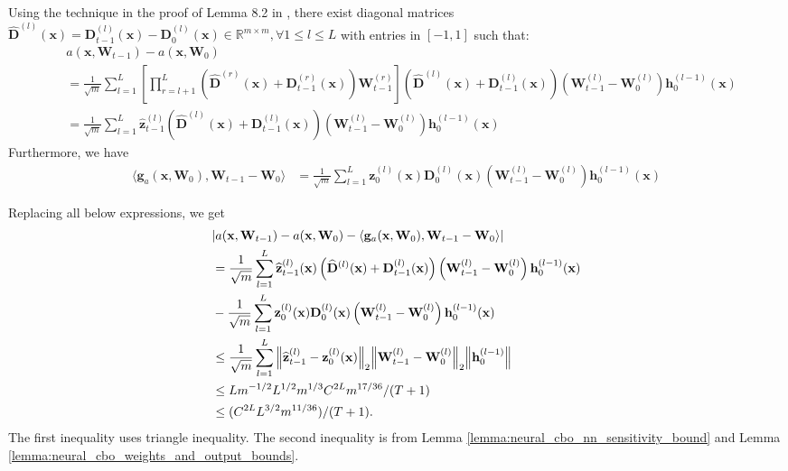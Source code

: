 Using the technique in the proof of Lemma 8.2 in \citep{allen2019convergence},  there exist diagonal matrices $\widehat{\mathbf{D}}^{(l)} (\mathbf{x}) = \mathbf{D}_{t-1}^{(l)}(\mathbf{x}) - \mathbf{D}_{0}^{(l)}(\mathbf{x})   \in \mathbb{R}^{m \times m}, \forall 1\le l \le L$ with entries in
$[-1,1]$ such that:
\begin{align*}
    &  a(\mathbf{x}, \mathbf{W}_{t-1}) - a(\mathbf{x}, \mathbf{W}_{0}) 
    \\
    & = \frac{1}{\sqrt{m}} \sum_{l=1}^L \left [ \prod_{r = l+1}^L \left(\widehat{\mathbf{D}}^{(r)} (\mathbf{x}) + \mathbf{D}_{t-1}^{(r)} (\mathbf{x}) \right) \mathbf{W}_{t-1}^{(r)} \right] \left (\widehat{\mathbf{D}}^{(l)} (\mathbf{x}) + \mathbf{D}_{t-1}^{(l)} (\mathbf{x}) \right) (\mathbf{W}_{t-1}^{(l)} - \mathbf{W}_{0}^{(l)}) \mathbf{h}_{0}^{(l-1)} (\mathbf{x})
    \\
    & = \frac{1}{\sqrt{m}} \sum_{l=1}^L  \widehat{\mathbf{z}}_{t-1}^{(l)} \left (\widehat{\mathbf{D}}^{(l)} (\mathbf{x}) + \mathbf{D}_{t-1}^{(l)} (\mathbf{x}) \right) \left( \mathbf{W}_{t-1}^{(l)} - \mathbf{W}_{0}^{(l)} \right) \mathbf{h}_{0}^{(l-1)} (\mathbf{x})
\end{align*}
Furthermore, we have 
\begin{align*}
    \langle \mathbf{g}_{a}(\mathbf{x}, \mathbf{W}_0), \mathbf{W}_{t-1} - \mathbf{W}_0 \rangle &= \frac{1}{\sqrt{m}}\sum_{l=1}^L  \mathbf{z}_0^{(l)}(\mathbf{x}) \mathbf{D}_0^{(l)}(\mathbf{x}) \left(\mathbf{W}_{t-1}^{(l)} -  \mathbf{W}_0^{(l)}\right) \mathbf{h}_0^{(l-1)}(\mathbf{x}) 
\end{align*}

Replacing all below expressions, we get
\begin{align*}
    & \lvert a(\mathbf{x}, \mathbf{W}_{t-1}) -  a(\mathbf{x}, \mathbf{W}_{0}) - \langle \mathbf{g}_{a}(\mathbf{x}, \mathbf{W}_0), \mathbf{W}_{t-1} - \mathbf{W}_0 \rangle \rvert 
    \\
    & = \frac{1}{\sqrt{m}} \sum_{l=1}^L  \widehat{\mathbf{z}}_{t-1}^{(l)} (\mathbf{x}) \left (\widehat{\mathbf{D}}^{(l)} (\mathbf{x}) + \mathbf{D}_{t-1}^{(l)} (\mathbf{x}) \right) \left( \mathbf{W}_{t-1}^{(l)} - \mathbf{W}_{0}^{(l)} \right) \mathbf{h}_{0}^{(l-1)} (\mathbf{x})
    \\ 
    & - \frac{1}{\sqrt{m}}\sum_{l=1}^L  \mathbf{z}_0^{(l)}(\mathbf{x}) \mathbf{D}_0^{(l)}(\mathbf{x}) \left(\mathbf{W}_{t-1}^{(l)} -  \mathbf{W}_0^{(l)}\right) \mathbf{h}_0^{(l-1)}(\mathbf{x})
    \\
    & \le \frac{1}{\sqrt{m}}\sum_{l=1}^L \norm{\widehat{\mathbf{z}}_{t-1}^{(l)} - \mathbf{z}_0^{(l)}(\mathbf{x})}_2  \norm{\mathbf{W}_{t-1}^{(l)} -  \mathbf{W}_0^{(l)}}_2 \norm{\mathbf{h}_{0}^{(l-1)}}
    \\
    & \le L m^{-1/2} L^{1/2} m^{1/3} C^{2L} m^{17/36} / (T+1)
    \\ 
    & \le (C^{2L} L^{3/2} m^{11/36}) / (T+1).
\end{align*} 
The first inequality uses triangle inequality. The second inequality is from Lemma \ref{lemma:neural_cbo_nn_sensitivity_bound} and Lemma  \ref{lemma:neural_cbo_weights_and_output_bounds}.
